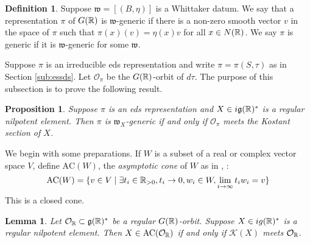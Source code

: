 \documentclass{article}
\newtheorem{lem}[thm]{Lemma}
\newtheorem{pro}[thm]{Proposition}
\theoremstyle{definition}
\newtheorem{dfn}[thm]{Definition}
\numberwithin{equation}{section}
\renewcommand{\-}{\hyp{}}
\newcommand{\g}{\mathfrak g}
\renewcommand{\O}{\mathcal O}
\newcommand{\K}{\mathcal K}
\newcommand{\w}{\mathfrak w}
\newcommand{\AC}{\mathrm{AC}}
\begin{document}
\begin{dfn}
Suppose $\w=[(B,\eta)]$ is a Whittaker datum. We say that a representation $\pi$ of $G(\mathbb{R})$ is $\w$-generic if there is a non-zero smooth vector $v$ in the space of $\pi$ such that $\pi(x)(v)=\eta(x)v$ for all $x\in N(\mathbb{R})$. We say $\pi$ is generic if it is $\w$-generic for some $\w$. 
\end{dfn}

Suppose $\pi$ is an irreducible eds representation and write $\pi=\pi(S,\tau)$ as in Section  \ref{sub:essds}.
Let $\O_\pi$ be the $G(\mathbb{R})$-orbit of $d\tau$. 
The purpose of this subsection is to prove the following result.

\begin{pro}
  \label{p:whittaker}
Suppose $\pi$ is an eds representation and $X\in i\g(\R)^*$ is a regular nilpotent element.
Then $\pi$ is $\w_X$-generic if and only if $\O_\pi$ meets the Kostant section of $X$.
\end{pro}

We begin with some preparations. If $W$ is a subset of a real or complex vector space $V$, define  $\AC(W)$,  the  {\it asymptotic cone} of $W$ as in   \cite[Proposition 3.7]{bvlocal}, \cite[Definition 2.9]{avav}:
$$
\AC(W)=\{v\in V\mid \exists t_i\in \R_{>0},t_i\rightarrow 0,w_i\in W,\lim_{i\rightarrow\infty}t_i w_i=v\}
$$
This is a closed cone. 

\begin{lem} \label{lem:g1}
  Let $\O_\R\subset \g(\R)^*$ be a regular $G(\mathbb{R})$-orbit.  Suppose  $X\in ig(\mathbb{R})^*$ is a regular nilpotent element.
Then  $X\in \AC(\O_\R)$ if and only if $\K(X)$ meets $\O_\R$.
\end{lem}
\end{document}
